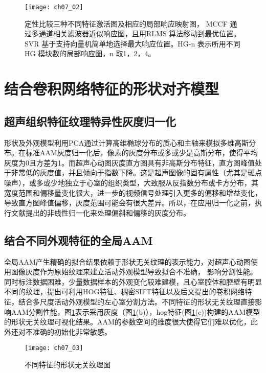 \begin{figure}[!htbp]
    \centering
    \texttt{[image: ch07\_02]}
    \caption{定性比较三种不同特征激活图及相应的局部响应映射图， MCCF 通过多通道相关滤波器近似响应图，且用RLMS 算法移动到最优位置。SVR 基于支持向量机简单地选择最大响应位置。HG-n 表示所用不同HG 模块数的局部响应图，n 取1，2，4。}
    \label{fig:ch07_02}
    \end{figure}
     
\section{结合卷积网络特征的形状对齐模型} 

\subsection{超声组织特征纹理特异性灰度归一化} 
形状及外观模型利用PCA通过计算高维椭球分布的质心和主轴来模拟多维高斯分布。在标准AAM灰度归一化后，像素的灰度分布或多或少是高斯分布，使得平均灰度为0且方差为1。而超声心动图灰度直方图具有非高斯分布特征，直方图峰值处于非常低的灰度值，并且倾向于指数下降。这是超声图像的固有属性（尤其是斑点噪声），或多或少地独立于心室的组织类型，大致服从反指数分布或卡方分布\citep{Bosch2002}，其宽度范围和偏移量变化很大，进一步的视频信号处理引入更多的偏移和增益变化，导致直方图峰值偏移，灰度范围可能会有很大差异。所以，在应用归一化之前，执行文献提出的非线性归一化来处理偏斜和偏移的灰度分布。

\subsection{结合不同外观特征的全局AAM}
全局AAM产生精确的拟合结果依赖于形状无关纹理的表示能力，对超声心动图使用图像灰度作为原始纹理来建立活动外观模型导致拟合不准确， 影响分割性能。同时标注数据困难，少量数据样本的外观变化较难建模，且心室腔体和腔壁有明显不同的纹理，提出可利用HOG特征、稠密SIFT特征以及后文提出的卷积网络特征，结合多尺度活动外观模型的左心室分割方法。不同特征的形状无关纹理直接影响AAM分割性能，图\ref{fig:ch07_02}表示采用灰度（图\ref{fig:ch07_02}(b)），hog特征(图\ref{fig:ch07_02}(c))构建的AAM模型的形状无关纹理可视化结果。AAM的参数空间的维度很大使得它们难以优化，此外还对不准确的初始化非常敏感。
\begin{figure}[!htbp]
\centering
\texttt{[image: ch07\_03]}
\caption{不同特征的形状无关纹理图}
\label{fig:ch07_03}
\end{figure} 
 
